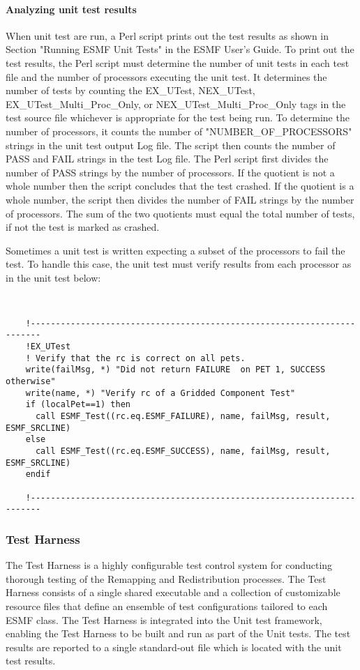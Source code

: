 \paragraph{Analyzing unit test results }
When unit test are run, a Perl script prints out the test results as shown in
Section "Running ESMF Unit Tests" in the ESMF User's Guide. To print out the test results,
the Perl script must determine the number of unit tests in each test file and the number of
processors executing the unit test. It determines the number of tests by counting the
EX\_UTest, NEX\_UTest, EX\_UTest\_Multi\_Proc\_Only, or NEX\_UTest\_Multi\_Proc\_Only 
tags in the test source file whichever is appropriate for the test being run. 
To determine the number of processors, it counts the number of "NUMBER\_OF\_PROCESSORS" strings in the
unit test output Log file. The script then counts the number of PASS and FAIL strings in the
test Log file.
The Perl script first divides the number of PASS strings by the number of processors. If the
quotient is not a whole  number then the script concludes that the test crashed. If the quotient
is a whole number, the script then divides the number of FAIL strings by the number of processors.
The sum of the two quotients must equal the total number of tests, if not the test is marked
as crashed.

Sometimes a unit test is written expecting a subset of the processors to fail the test. To
handle this case, the unit test must verify results from each processor as in the unit test below:
\begin{verbatim}


    !------------------------------------------------------------------------
    !EX_UTest
    ! Verify that the rc is correct on all pets.
    write(failMsg, *) "Did not return FAILURE  on PET 1, SUCCESS otherwise"
    write(name, *) "Verify rc of a Gridded Component Test"
    if (localPet==1) then
      call ESMF_Test((rc.eq.ESMF_FAILURE), name, failMsg, result, ESMF_SRCLINE)
    else
      call ESMF_Test((rc.eq.ESMF_SUCCESS), name, failMsg, result, ESMF_SRCLINE)
    endif

    !------------------------------------------------------------------------

\end{verbatim}

\subsubsection{Test Harness}
The Test Harness is a highly configurable test control system for conducting 
thorough testing of the Remapping and Redistribution processes. The Test Harness 
consists of a single shared executable and a collection of customizable resource
files that define an ensemble of test configurations tailored to each ESMF class.
The Test Harness is integrated into the Unit test framework, enabling
the Test Harness to be built and run as part of the Unit tests. The test results 
are reported to a single standard-out file which is located with the unit test 
results.

